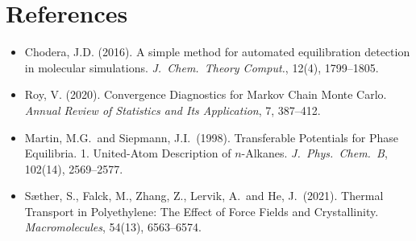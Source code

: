 
\section*{References}

\begin{itemize}
  \item Chodera, J.D. (2016). A simple method for automated equilibration
        detection in molecular simulations.
        \textit{J.\ Chem.\ Theory Comput.}, 12(4), 1799--1805.

  \item Roy, V. (2020). Convergence Diagnostics for Markov Chain Monte
        Carlo. \textit{Annual Review of Statistics and Its Application},
        7, 387--412.

  \item Martin, M.G.\ and Siepmann, J.I.\ (1998). Transferable Potentials
        for Phase Equilibria. 1. United-Atom Description of $n$-Alkanes.
        \textit{J.\ Phys.\ Chem.\ B}, 102(14), 2569--2577.
  \item Sæther, S., Falck, M., Zhang, Z., Lervik, A.\ and He, J.\ (2021).
        Thermal Transport in Polyethylene: The Effect of Force Fields and
        Crystallinity.
        \textit{Macromolecules}, 54(13), 6563--6574.
\end{itemize}